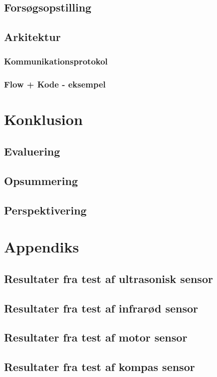 \chapter{Forsøgsopstilling}

\chapter{Arkitektur}

\section{Kommunikationsprotokol}\label{kommunikation}

\section{Flow + Kode - eksempel}


\part{Konklusion}
\chapter{Evaluering}
\chapter{Opsummering}
\chapter{Perspektivering}

\appendix
\part{Appendiks}
\chapter{Resultater fra test af ultrasonisk sensor}

\chapter{Resultater fra test af infrarød sensor}

\chapter{Resultater fra test af motor sensor}

\chapter{Resultater fra test af kompas sensor}




